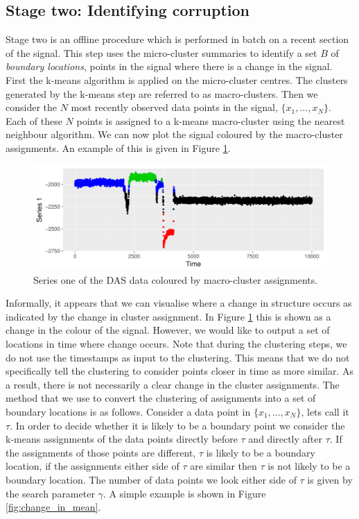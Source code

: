 \subsection{Stage two: Identifying corruption}
\label{sec:das_stage_2}

Stage two is an offline procedure which is performed in batch on a recent section of the signal. This step uses the micro-cluster summaries to identify a set $B$ of \textit{boundary locations}, points in the signal where there is a change in the signal. First the k-means algorithm is applied on the micro-cluster centres. The clusters generated by the k-means step are referred to as macro-clusters. Then we consider the  $N$ most recently observed data points in the signal, $\{ x_1, ..., x_N \}$. Each of these $N$ points is assigned to a k-means macro-cluster using the nearest neighbour algorithm. We can now plot the signal coloured by the macro-cluster assignments. An example of this is given in Figure \ref{fig:das_kmeans_col}.  

\begin{figure}[h]
  \centering
  \includegraphics[width = 13cm]{k_4_rep_1_series_1_new.pdf}
  \caption{Series one of the DAS data coloured by macro-cluster assignments.}
  \label{fig:das_kmeans_col}
\end{figure}

Informally, it appears that we can visualise where a change in structure occurs as indicated by the change in cluster assignment. In Figure \ref{fig:das_kmeans_col} this is shown as a change in the colour of the signal. However, we would like to output a set of locations in time where change occurs. Note that during the clustering steps, we do not use the timestamps as input to the clustering. This means that we do not specifically tell the clustering to consider points closer in time as more similar. As a result, there is not necessarily a clear change in the cluster assignments.
The method that we use to convert the clustering of assignments into a set of boundary locations is as follows. Consider a data point in $\{ x_1, ..., x_N \}$, lets call it $\tau$. In order to decide whether it is likely to be a boundary point we consider the k-means assignments of the data points directly before $\tau$ and directly after $\tau$. If the assignments of those points are different, $\tau$ is likely to be a boundary location, if the assignments either side of $\tau$ are similar then $\tau$ is not likely to be a boundary location. The number of data points we look either side of $\tau$ is given by the search parameter $\gamma$. A simple example is shown in Figure \ref{fig:change_in_mean}.


